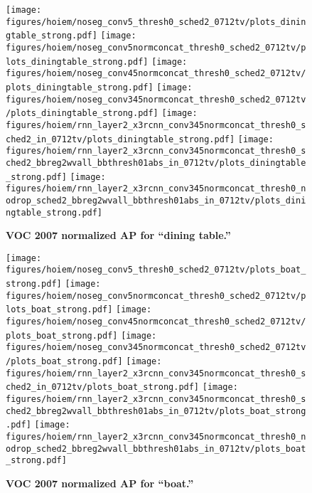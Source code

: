 \begin{figure}[t]
  \begin{center}
   \texttt{[image: figures/hoiem/noseg\_conv5\_thresh0\_sched2\_0712tv/plots\_diningtable\_strong.pdf]}
   \texttt{[image: figures/hoiem/noseg\_conv5normconcat\_thresh0\_sched2\_0712tv/plots\_diningtable\_strong.pdf]}
   \texttt{[image: figures/hoiem/noseg\_conv45normconcat\_thresh0\_sched2\_0712tv/plots\_diningtable\_strong.pdf]}
   \texttt{[image: figures/hoiem/noseg\_conv345normconcat\_thresh0\_sched2\_0712tv/plots\_diningtable\_strong.pdf]}
   \texttt{[image: figures/hoiem/rnn\_layer2\_x3rcnn\_conv345normconcat\_thresh0\_sched2\_in\_0712tv/plots\_diningtable\_strong.pdf]}
   \texttt{[image: figures/hoiem/rnn\_layer2\_x3rcnn\_conv345normconcat\_thresh0\_sched2\_bbreg2wvall\_bbthresh01abs\_in\_0712tv/plots\_diningtable\_strong.pdf]}
   \texttt{[image: figures/hoiem/rnn\_layer2\_x3rcnn\_conv345normconcat\_thresh0\_nodrop\_sched2\_bbreg2wvall\_bbthresh01abs\_in\_0712tv/plots\_diningtable\_strong.pdf]}
  \end{center}
  \vspace{-12pt}
  \caption{\textbf{VOC 2007 normalized AP for ``dining table.''}
  }
  \label{fig:hoiem}
\end{figure}

\begin{figure}[t]
  \begin{center}
   \texttt{[image: figures/hoiem/noseg\_conv5\_thresh0\_sched2\_0712tv/plots\_boat\_strong.pdf]}
   \texttt{[image: figures/hoiem/noseg\_conv5normconcat\_thresh0\_sched2\_0712tv/plots\_boat\_strong.pdf]}
   \texttt{[image: figures/hoiem/noseg\_conv45normconcat\_thresh0\_sched2\_0712tv/plots\_boat\_strong.pdf]}
   \texttt{[image: figures/hoiem/noseg\_conv345normconcat\_thresh0\_sched2\_0712tv/plots\_boat\_strong.pdf]}
   \texttt{[image: figures/hoiem/rnn\_layer2\_x3rcnn\_conv345normconcat\_thresh0\_sched2\_in\_0712tv/plots\_boat\_strong.pdf]}
   \texttt{[image: figures/hoiem/rnn\_layer2\_x3rcnn\_conv345normconcat\_thresh0\_sched2\_bbreg2wvall\_bbthresh01abs\_in\_0712tv/plots\_boat\_strong.pdf]}
   \texttt{[image: figures/hoiem/rnn\_layer2\_x3rcnn\_conv345normconcat\_thresh0\_nodrop\_sched2\_bbreg2wvall\_bbthresh01abs\_in\_0712tv/plots\_boat\_strong.pdf]}
  \end{center}
  \vspace{-12pt}
  \caption{\textbf{VOC 2007 normalized AP for ``boat.''}
  }
  \label{fig:hoiem}
\end{figure}

